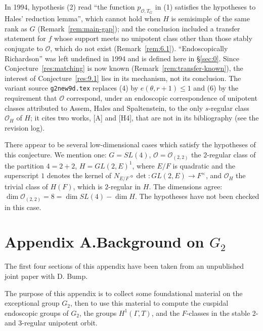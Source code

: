 \documentclass[12pt,letterpaper]{amsart}
\makeatletter
\theoremstyle{plain}
\theoremstyle{definition}
\newcommand{\fixedlabel}[1]{\phantomsection\def\@currentlabel{#1}}
\theoremstyle{remark}
\theoremstyle{definition}
\makeatother
\begin{document}
\begin{rem26}\label{rem:9.1}
In 1994, hypothesis (2) read ``the function $p_{\mathcal O,T_G}$ in (1)
satisfies the hypotheses to Hales' reduction lemma'', which cannot hold when
$H$ is semisimple of the same rank as $G$ (Remark~\ref{rem:main-gap}); and
the conclusion included a transfer statement for $f$ whose support meets no
unipotent class other than those stably conjugate to $\mathcal O$, which do
not exist (Remark~\ref{rem:6.1}). ``Endoscopically Richardson'' was left undefined in 1994 and is defined here
in \S\ref{sec:0}. Since Conjecture~\ref{res:matching} is now known
(Remark~\ref{rem:transfer-known}), the interest of Conjecture~\ref{res:9.1}
lies in its mechanism, not its conclusion. The variant source
\texttt{g2new9d.tex} replaces (4) by $e(\theta,r+1)\leq1$ and (6) by the
requirement that $\mathcal O$ correspond, under an endoscopic correspondence
of unipotent classes attributed to Assem, Hales and Spaltenstein, to the only
$s$-regular class $\mathcal O_H$ of $H$; it cites two works, [A] and [H4],
that are not in its bibliography (see the revision log).
\end{rem26}

There appear to be several low-dimensional cases which
satisfy the hypotheses of this conjecture. We mention one:
$G=SL(4)$, ${\mathcal O}={\mathcal O}_{(2,2)}$ the $2$-regular class
of the partition $4=2+2$, $H=GL(2,E)^1$, where $E/F$ is quadratic
and the superscript $1$ denotes the kernel of
$N_{E/F}\circ \det :GL(2,E)\rightarrow F^{\times}$, and
${\mathcal O}_H$ the trivial class of $H(F)$, which is $2$-regular in $H$.
The dimensions agree: $\dim\mathcal O_{(2,2)}=8=\dim SL(4)-\dim H$. The
hypotheses have not been checked in this case.
\section*{\texorpdfstring{Appendix A.\quad Background on $G_2$}{Appendix A. Background on G2}}\fixedlabel{A}\label{sec:A}

The first four sections of this appendix have been taken from an
unpublished joint paper with D. Bump.

The purpose of this appendix is to collect some foundational material on
the exceptional group $G_2$, then to use this material to
compute the cuspidal endoscopic groups of
$G_2$, the groups $H^1(\Gamma, T)$, and the $F$-classes in the
stable 2- and 3-regular unipotent orbit.
\end{document}
